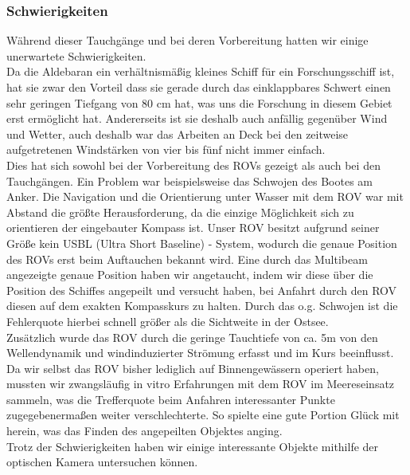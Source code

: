 \subsubsection{Schwierigkeiten}
Während dieser Tauchgänge und bei deren Vorbereitung hatten wir einige unerwartete Schwierigkeiten.\\
Da die Aldebaran ein verhältnismäßig kleines Schiff für ein Forschungsschiff ist, hat sie zwar den Vorteil dass sie gerade durch das einklappbares Schwert einen sehr geringen Tiefgang von 80 cm hat, was uns die Forschung in diesem Gebiet erst ermöglicht hat.
Andererseits ist sie deshalb auch anfällig gegenüber Wind und Wetter, auch deshalb war das Arbeiten an Deck bei den zeitweise aufgetretenen Windstärken von vier bis fünf nicht immer einfach.\\
Dies hat sich sowohl bei der Vorbereitung des ROVs gezeigt als auch bei den Tauchgängen. Ein Problem war beispielsweise das Schwojen des Bootes am Anker.
Die Navigation und die Orientierung unter Wasser mit dem ROV war mit Abstand die größte Herausforderung, da die einzige Möglichkeit sich zu orientieren der eingebauter Kompass ist.
Unser ROV besitzt aufgrund seiner Größe kein USBL (Ultra Short Baseline) - System, wodurch die genaue Position des ROVs erst beim Auftauchen bekannt wird.
Eine durch das Multibeam angezeigte genaue Position haben wir angetaucht, indem wir diese über die Position des Schiffes angepeilt und versucht haben, bei Anfahrt durch den ROV diesen auf dem exakten Kompasskurs zu halten.
Durch das o.g. Schwojen ist die Fehlerquote hierbei schnell größer als die Sichtweite in der Ostsee. \\ Zusätzlich wurde das ROV 
durch die geringe Tauchtiefe von ca. 5m von den Wellendynamik und windinduzierter Strömung erfasst und im Kurs beeinflusst. 
Da wir selbst das ROV bisher lediglich auf Binnengewässern operiert haben, mussten wir zwangsläufig in vitro Erfahrungen mit dem ROV im Meereseinsatz sammeln, was die Trefferquote beim Anfahren interessanter Punkte zugegebenermaßen weiter verschlechterte. So spielte eine gute Portion Glück mit herein, was das Finden des angepeilten Objektes anging.\\
Trotz der Schwierigkeiten haben wir einige interessante Objekte mithilfe der optischen Kamera untersuchen können.\\


